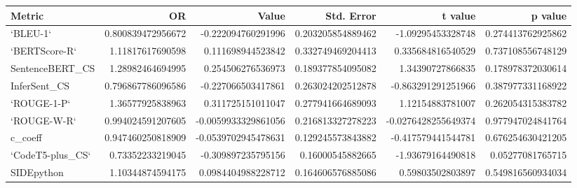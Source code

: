 \begin{tabular}{lrrrrr}
\hline
Metric & OR & Value & Std. Error & t value & p value
\\
\hline
`BLEU-1` & 0.800839472956672 & -0.222094760291996 & 0.203205854889462 & -1.09295453328748 & 0.274413762925862
\\
`BERTScore-R` & 1.11817617690598 & 0.111698944523842 & 0.332749469204413 & 0.335684816540529 & 0.737108556748129
\\
SentenceBERT\_CS & 1.28982464694995 & 0.254506276536973 & 0.189377854095082 & 1.34390727866835 & 0.178978372030614
\\
InferSent\_CS & 0.796867786096586 & -0.227066503417861 & 0.263024202512878 & -0.863291291251966 & 0.387977331168922
\\
`ROUGE-1-P` & 1.36577925838963 & 0.311725151011047 & 0.277941664689093 & 1.12154883781007 & 0.262054315383782
\\
`ROUGE-W-R` & 0.994024591207605 & -0.0059933329861056 & 0.216813327278223 & -0.0276428255649374 & 0.977947024841764
\\
c\_coeff & 0.947460250818909 & -0.0539702945478631 & 0.129245573843882 & -0.417579441544781 & 0.676254630421205
\\
`CodeT5-plus\_CS` & 0.73352233219045 & -0.309897235795156 & 0.16000545882665 & -1.93679164490818 & 0.05277081765715
\\
SIDEpython & 1.10344874594175 & 0.0984404988228712 & 0.164606576885086 & 0.59803502803897 & 0.549816560934034
\\
\hline
\end{tabular}
